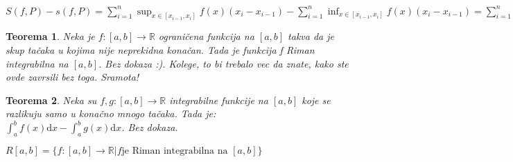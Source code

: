 \documentclass{article}
\newtheorem{teorema}{Teorema}[section]
\begin{document}
$S(f, P) - s(f, P) = \displaystyle \sum^n_{i = 1}\sup_{x\in[x_{i-1}, x_i]}f(x)(x_i - x_{i-1}) - \sum^n_{i = 1}\inf_{x\in[x_{i-1}, x_i]}f(x)(x_i - x_{i-1}) = \sum_{i=1}^n(f(x_i)-f(x_{i-1})(x_i - x_{i-1}) < \sum^n_{i=1}(f(x_i) - f(x_{i-1}))\frac{\varepsilon}{f(b) - f(a)} = \frac{\varepsilon}{f(b) - f(a)}\sum^n_{i=1}(f(x_i) - f(x_{i-1})) = \frac{\varepsilon}{f(b) - f(a)} (f(b) - f(a)) = \varepsilon$
\begin{teoremabox}
    \begin{teorema}
        Neka je $f:[a, b] \longrightarrow \mathbb{R}$ ograničena funkcija na $[a, b]$ takva da je skup tačaka u kojima nije neprekidna konačan. Tada je funkcija f Riman integrabilna na $[a, b]$. Bez dokaza :). Kolege, to bi trebalo vec da znate, kako ste ovde zavrsili bez toga. Sramota!
    \end{teorema}
\end{teoremabox}
\begin{teoremabox}
    \begin{teorema}
        Neka su $f, g: [a, b] \longrightarrow \mathbb{R}$ integrabilne funkcije na $[a, b]$ koje se razlikuju samo u konačno mnogo tačaka. Tada je:\\
        $\displaystyle \int_a^b f(x)\text{d}x - \int_a^b g(x)\text{d}x$. Bez dokaza.
    \end{teorema}
\end{teoremabox}
$R[a, b] = \{f:[a, b] \longrightarrow \mathbb{R} | f \text{je Riman integrabilna na } [a, b]\}$
\end{document}
